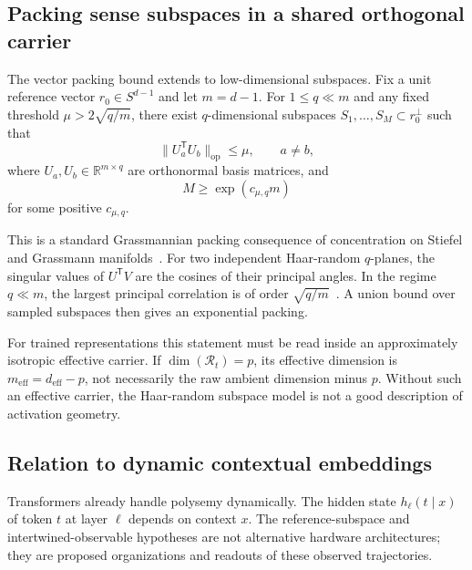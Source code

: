 \documentclass[
  aps,
  reprint,
  superscriptaddress,
  floatfix,
  nofootinbib,
  longbibliography
]{revtex4-2}
\newcommand{\R}{\mathbb{R}}
\newcommand{\Sph}[1]{S^{#1}}
\newcommand{\deff}{d_{\mathrm{eff}}}
\newcommand{\meff}{m_{\mathrm{eff}}}
\newcommand{\T}{^{\mathsf{T}}}
\newcommand{\opnorm}[1]{\lVert #1 \rVert_{\mathrm{op}}}
\begin{document}
\subsection{Packing sense subspaces in a shared orthogonal carrier}
\label{sec:grassmann}

The vector packing bound extends to low-dimensional subspaces. Fix a unit
reference vector $r_0\in\Sph{d-1}$ and let $m=d-1$. For $1\le q\ll m$ and
any fixed threshold $\mu>2\sqrt{q/m}$, there exist $q$-dimensional
subspaces $S_1,\dots,S_M\subset r_0^\perp$ such that
%
\begin{equation}
\label{eq:grassmann-coherence}
\opnorm{U_a\T U_b}\le \mu,\qquad a\neq b,
\end{equation}
%
where $U_a,U_b\in\R^{m\times q}$ are orthonormal basis matrices, and
%
\begin{equation}
\label{eq:grassmann-count}
M\ge \exp(c_{\mu,q}m)
\end{equation}
%
for some positive $c_{\mu,q}$.

This is a standard Grassmannian packing consequence of concentration on
Stiefel and Grassmann manifolds~\cite{szarek1982nets,conway1996packings}.
For two independent Haar-random $q$-planes, the singular values of $U\T V$
are the cosines of their principal angles. In the regime $q\ll m$, the
largest principal correlation is of order
$\sqrt{q/m}$~\cite{chikuse2003statistics,absil2006condition,edelman1998random}.
A union bound over sampled subspaces then gives an exponential packing.

For trained representations this statement must be read inside an
approximately isotropic effective carrier. If
$\dim(\mathcal R_t)=p$, its effective dimension is
$\meff=\deff-p$, not necessarily the raw ambient dimension minus $p$.
Without such an effective carrier, the Haar-random subspace model is not a
good description of activation geometry.

\subsection{Relation to dynamic contextual embeddings}
\label{sec:dynamic}

Transformers already handle polysemy dynamically. The hidden state
$h_\ell(t\mid x)$ of token $t$ at layer $\ell$ depends on context $x$.
The reference-subspace and intertwined-observable hypotheses are not
alternative hardware architectures; they are proposed organizations and
readouts of these observed trajectories.
\end{document}
